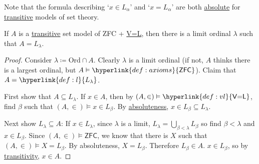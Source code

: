 \documentclass{article}
\newcommand{\1}{\mathbbm{1}}
\let\models\vDash
\begin{document}
Note that the formula describing `$x \in L_\alpha$' and `$x = L_\alpha$' are both \hyperlink{def:abso}{absolute} for \hyperlink{def:transitive}{transitive} models of set theory.

\begin{prop}
  If $A$ is a \hyperlink{def:transitive}{transitive} set model of \textsf{ZFC} + \hyperlink{def:vl}{\textsf{V=L}}, then there is a limit ordinal $\lambda$ such that $A = L_\lambda$.
\end{prop}
\begin{proof}
  \newlec
  Consider $\lambda \coloneqq \text{Ord} \cap A$. Clearly $\lambda$ is a limit ordinal (if not, $A$ thinks there is a largest ordinal, but $A \models \hyperlink{def:axioms}{\textsf{ZFC}}$).
  Claim that $A = \hyperlink{def:l}{L_\lambda}$.


  First show that $A \subseteq L_\lambda$. If $x \in A$, then by $(A,\in) \models \hyperlink{def:vl}{\textsf{V=L}}$, find $\beta$ such that $(A,\in) \models x \in L_\beta$. By \hyperlink{def:abso}{absoluteness}, $x \in L_\beta \subseteq L_\lambda$.

  Next show $L_\lambda \subseteq A$: If $x \in L_\lambda$, since $\lambda$ is a limit, $L_\lambda = \bigcup_{\beta < \lambda} L_\beta$ so find $\beta < \lambda$ and $x\in L_\beta$.
  Since $(A,\in) \models \textsf{ZFC}$, we know that there is $X$ such that $(A,\in) \models X = L_\beta$. By absoluteness, $X = L_\beta$.
  Therefore $L_\beta \in A$. $x \in L_\beta$, so by \hyperlink{def:transitive}{transitivity}, $x \in A$.
\end{proof}
\end{document}

